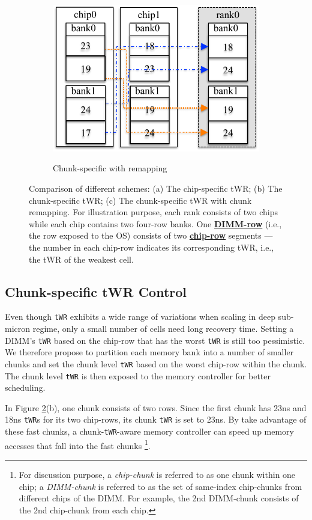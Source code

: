 \begin{figure}
\begin{subfigure}{.35\textwidth}
    	\includegraphics[width=\linewidth]{figures/chunk_sort.pdf}\\
    \caption{Chunk-specific with remapping}
    \label{fig:chunk_sort}
  \end{subfigure}
  \vspace{-0.45in}
\caption{Comparison of different schemes: (a) The chip-specific tWR; (b) The chunk-specific tWR; (c) The chunk-specific tWR with chunk remapping. For illustration purpose, each rank consists of two chips while each chip contains two four-row banks. One {\underline {\bf DIMM-row}} (i.e., the row exposed to the OS) consists of two {\underline {\bf chip-row}} segments --- the number in each chip-row indicates its corresponding tWR, i.e., the tWR of the weakest cell.}
\label{fig:schemes}
\end{figure}

\subsection{Chunk-specific tWR Control}
Even though {\tt tWR} exhibits a wide range of variations when scaling in deep sub-micron regime, only a small number of cells need long recovery time.  Setting a DIMM's {\tt tWR} based on the chip-row that has the worst {\tt tWR} is still too pessimistic.
We therefore propose to partition each memory bank into a number of smaller chunks and set the chunk level {\tt tWR} based on the worst chip-row within the chunk. 
The chunk level {\tt tWR} is then exposed to the memory controller for better scheduling.

In Figure \ref{fig:schemes}(b), one chunk consists of two rows. Since the first chunk has 23ns and 18ns {\tt tWR}s for its two chip-rows, its chunk {\tt tWR} is set to 23ns.
By take advantage of these fast chunks, a chunk-{\tt tWR}-aware memory controller can speed up memory accesses that fall into the fast chunks
\footnote{For discussion purpose, a {\em chip-chunk} is referred to as one chunk within one chip; a {\em DIMM-chunk} is referred to as the set of same-index chip-chunks from different chips of the DIMM. For example, the 2nd DIMM-chunk consists of the 2nd chip-chunk from each chip.}.


